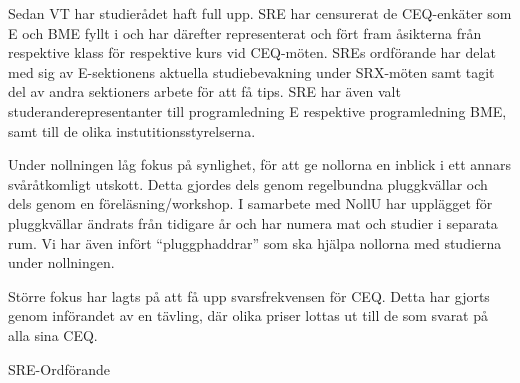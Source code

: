 \documentclass[../_main/handlingar.tex]{subfiles}
\begin{document}

Sedan VT har studierådet haft full upp. SRE har censurerat de CEQ-enkäter som E och BME fyllt i och har därefter representerat och fört fram åsikterna från respektive klass för respektive kurs vid CEQ-möten. SREs ordförande har delat med sig av E-sektionens aktuella studiebevakning under SRX-möten samt tagit del av andra sektioners arbete för att få tips. SRE har även valt studeranderepresentanter till programledning E respektive programledning BME, samt till de olika instutitionsstyrelserna.

Under nollningen låg fokus på synlighet, för att ge nollorna en inblick i ett annars svåråtkomligt utskott. Detta gjordes dels genom regelbundna pluggkvällar och dels genom en föreläsning/workshop. I samarbete med NollU har upplägget för pluggkvällar ändrats från tidigare år och har numera mat och studier i separata rum. Vi har även infört ``pluggphaddrar'' som ska hjälpa nollorna med studierna under nollningen.

Större fokus har lagts på att få upp svarsfrekvensen för CEQ. Detta har gjorts genom införandet av en tävling, där olika priser lottas ut till de som svarat på alla sina CEQ.

\begin{signatures}{1}
    \mvh
    \signature{Johan Persson}{SRE-Ordförande}
\end{signatures}
\end{document}
